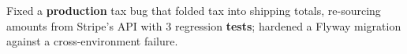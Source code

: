 \documentclass[letterpaper,10pt]{article}
\newcommand{\resumeItem}[1]{
  \item\small{
    {#1 \vspace{-3pt}}
  }
}
\begin{document}
        \resumeItem{Fixed a \textbf{production} tax bug that folded tax into shipping totals, re-sourcing amounts from Stripe's API with 3 regression \textbf{tests}; hardened a Flyway migration against a cross-environment failure.}
\end{document}

